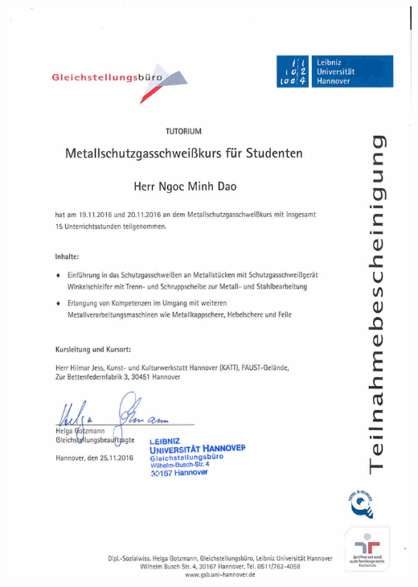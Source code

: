 \documentclass[12pt,a4paper]{scrartcl}
\begin{document}
\newpage
\includegraphics[width=\linewidth, height=\textheight]
{./zeugnisse/schweissenkurs_lq.jpg}

\end{document}
